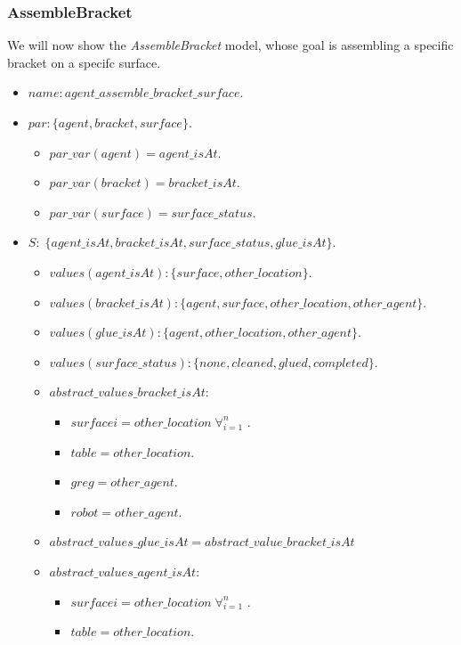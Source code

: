 \subsubsection{AssembleBracket}
We will now show the \textit{AssembleBracket} model, whose goal is assembling a specific bracket on a specifc surface.
\begin{itemize}
	\item $name: agent\_assemble\_bracket\_surface$.
	\item		$par: \{agent,bracket,surface\}$.
		\begin{itemize}
			\item $par\_var(agent)=agent\_isAt$.
			\item $par\_var(bracket)=bracket\_isAt$.
			\item $par\_var(surface)=surface\_status$.
		\end{itemize}

	\item $S:\;\{agent\_isAt,bracket\_isAt,surface\_status,glue\_isAt\}$. 
		\begin{itemize}
			\item $values(agent\_isAt):\{surface,other\_location\}$.
			\item $values(bracket\_isAt):\{agent,surface, other\_location,other\_agent\}$. 
			\item $values(glue\_isAt):\{agent,other\_location,other\_agent\}$. 
			\item $values(surface\_status):\{none,cleaned,glued,completed\}$.
		\end{itemize}
		\begin{itemize}
			\item $abstract\_values\_bracket\_isAt$: 
				\begin{itemize}
					\item $surfacei=other\_location\; \forall_{i=1}^n$ .
					\item $table=other\_location$.
					\item $greg=other\_agent$.
					\item $robot=other\_agent$.
				\end{itemize}	
			\item $abstract\_values\_glue\_isAt=abstract\_value\_bracket\_isAt$ 
			\item $abstract\_values\_agent\_isAt$:
				\begin{itemize}
					\item $surfacei=other\_location\; \forall_{i=1}^n$ .
					\item $table=other\_location$.
				\end{itemize}
		\end{itemize}
		

\end{itemize}
